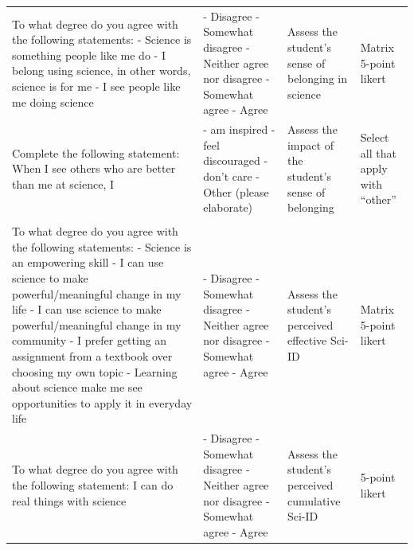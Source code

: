 \documentclass[10pt, twocolumn]{article}
\begin{document}
\begin{xltabular}{\textwidth}{|p{0.3\textwidth}|p{0.3\textwidth}|p{0.2\textwidth}|X|}
     \\ \hline
    To what degree do you agree with the following statements: \newline - Science is something people like me do \newline - I belong using science, in other words, science is for me \newline - I see people like me doing science & - Disagree \newline - Somewhat disagree \newline - Neither agree nor disagree \newline - Somewhat agree \newline - Agree & Assess the student's sense of belonging in science & Matrix 5-point likert \\ \hline
    Complete the following statement: When I see others who are better than me at science, I & - am inspired \newline - feel discouraged \newline - don't care \newline - Other (please elaborate) & Assess the impact of the student's sense of belonging & Select all that apply with ``other'' \\ \hline
     \\ \hline
    To what degree do you agree with the following statements: \newline - Science is an empowering skill \newline - I can use science to make powerful/meaningful change in my life \newline - I can use science to make powerful/meaningful change in my community \newline - I prefer getting an assignment from a textbook over choosing my own topic \newline - Learning about science make me see opportunities to apply it in everyday life & - Disagree \newline - Somewhat disagree \newline - Neither agree nor disagree \newline - Somewhat agree \newline - Agree & Assess the student's perceived effective Sci-ID & Matrix 5-point likert \\ \hline
    To what degree do you agree with the following statement: \newline I can do real things with science & - Disagree \newline - Somewhat disagree \newline - Neither agree nor disagree \newline - Somewhat agree \newline - Agree & Assess the student's perceived cumulative Sci-ID & 5-point likert \\ \hline
\end{xltabular}
\end{document}
